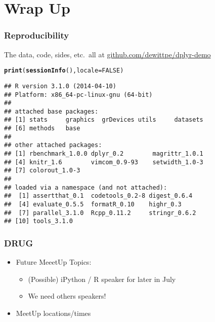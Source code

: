 \documentclass{beamer}\usepackage[]{graphicx}\usepackage[]{color}
\makeatletter
\newcommand{\hlnum}[1]{\textcolor[rgb]{0.686,0.059,0.569}{#1}}%
\newcommand{\hlstd}[1]{\textcolor[rgb]{0.345,0.345,0.345}{#1}}%
\newcommand{\hlkwc}[1]{\textcolor[rgb]{0.333,0.667,0.333}{#1}}%
\newcommand{\hlkwd}[1]{\textcolor[rgb]{0.737,0.353,0.396}{\textbf{#1}}}%
\newenvironment{kframe}{%
 \def\at@end@of@kframe{}%
 \ifinner\ifhmode%
  \def\at@end@of@kframe{\end{minipage}}%
  \begin{minipage}{\columnwidth}%
 \fi\fi%
 \def\FrameCommand##1{\hskip\@totalleftmargin \hskip-\fboxsep
 \colorbox{shadecolor}{##1}\hskip-\fboxsep
     \hskip-\linewidth \hskip-\@totalleftmargin \hskip\columnwidth}%
 \MakeFramed {\advance\hsize-\width
   \@totalleftmargin\z@ \linewidth\hsize
   \@setminipage}}%
 {\par\unskip\endMakeFramed%
 \at@end@of@kframe}
\newenvironment{knitrout}{}{} %
\makeatother
\begin{document}
\section{Wrap Up}%
\begin{frame}[fragile]
  \frametitle{Reproducibility}
  The data, code, sides, etc.\ all at \url{github.com/dewittpe/dplyr-demo}

\begin{knitrout}\footnotesize
{}\color{fgcolor}\begin{kframe}
\begin{alltt}
\hlkwd{print}\hlstd{(}\hlkwd{sessionInfo}\hlstd{(),} \hlkwc{locale} \hlstd{=} \hlnum{FALSE}\hlstd{)}
\end{alltt}
\begin{verbatim}
## R version 3.1.0 (2014-04-10)
## Platform: x86_64-pc-linux-gnu (64-bit)
## 
## attached base packages:
## [1] stats     graphics  grDevices utils     datasets 
## [6] methods   base     
## 
## other attached packages:
## [1] rbenchmark_1.0.0 dplyr_0.2        magrittr_1.0.1  
## [4] knitr_1.6        vimcom_0.9-93    setwidth_1.0-3  
## [7] colorout_1.0-3  
## 
## loaded via a namespace (and not attached):
##  [1] assertthat_0.1  codetools_0.2-8 digest_0.6.4   
##  [4] evaluate_0.5.5  formatR_0.10    highr_0.3      
##  [7] parallel_3.1.0  Rcpp_0.11.2     stringr_0.6.2  
## [10] tools_3.1.0
\end{verbatim}
\end{kframe}
\end{knitrout}
\end{frame} 

\begin{frame}[fragile]
  \frametitle{DRUG}
  \begin{itemize}
    \item Future MeeetUp Topics:
      \begin{itemize}
        \item (Possible) iPython / R speaker for later in July
        \item We need others speakers!
      \end{itemize}
    \item MeetUp locations/times
  \end{itemize}
\end{frame} 
\end{document}
